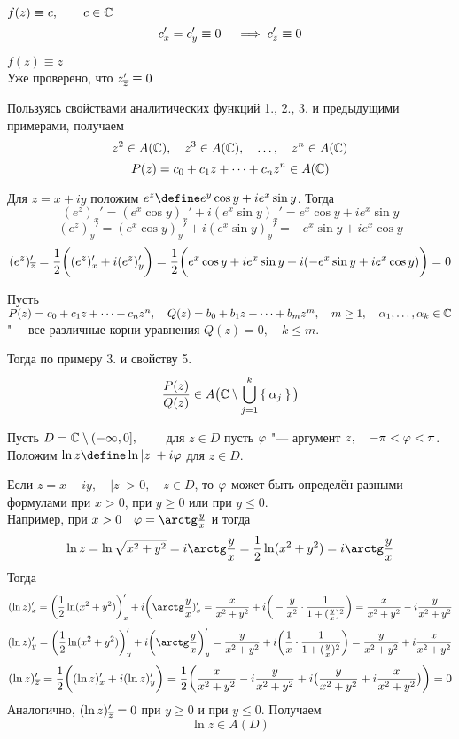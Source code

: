 \begin{exmpls}
	\item $ f(z) \equiv c, \qquad c \in \Co $
	$$ c_x' = c_y' \equiv 0 \quad \implies c_{\ol z}' \equiv 0 $$

	\item $ f(z) \equiv z $ \\
	Уже проверено, что $ z_{\ol z}' \equiv 0 $

	\item Пользуясь свойствами аналитических функций 1., 2., 3. и предыдущими примерами, получаем
	$$ z^2 \in A(\mathbb{C}), \quad z^3 \in A(\mathbb{C}), \quad \dots, \quad z^n \in A(\mathbb{C}) $$
	$$ P(z) = c_0 + c_1z + \dots + c_nz^n \in A(\mathbb{C}) $$

	\item Для $ z = x + iy $ положим $ e^z \define e^y \cos y + ie^x \sin y $. Тогда
	$$ (e^z)_x' = (e^x \cos y)_x' + i(e^x \sin y)_x' = e^x \cos y + ie^x \sin y $$
	$$ (e^z)_y' = (e^x \cos y)_y' + i(e^x \sin y)_y' = -e^x \sin y + ie^x \cos y $$
	$$ (e^z)_{\overline z}' = \frac12 \bigg( (e^z)_x' + i(e^z)_y' \bigg) = \frac12 \bigg( e^x\cos y + ie^x \sin y + i(-e^x \sin y + ie^x \cos y) \bigg) = 0 $$

	\item Пусть $ P(z) = c_0 + c_1z + \dots + c_nz^n, \quad Q(z) = b_0 + b_1z + \dots + b_mz^m, \quad m \ge 1, \quad \alpha_1, \dots, \alpha_k \in \mathbb{C} $ "--- все различные корни уравнения $ Q(z) = 0, \quad k \le m $.

	Тогда по примеру 3. и свойству 5.
	$$ \frac{P(z)}{Q(z)} \in A \big( \mathbb{C} \setminus \bigcup_{j = 1}^k \Set{\alpha_j} \big) $$

	\item Пусть $ D = \mathbb{C} \setminus (-\infty, 0], \qquad $ для $ z \in D $ пусть $ \varphi $ "--- аргумент $ z, \quad -\pi < \varphi < \pi $. \\
	Положим $ \ln z \define \ln|z| + i \vphi $ для $ z \in D $.

	Если $ z = x + iy, \quad |z| > 0, \quad z \in D $, то $ \varphi $ может быть определён разными формулами при $ x > 0 $, при $ y \ge 0 $ или при $ y \le 0 $. \\
	Например, при $ x > 0 \quad \vphi = \arctg \frac yx $ и тогда
	$$ \ln z = \ln \sqrt{x^2 + y^2} = i \arctg \frac yx = \frac12 \ln(x^2 + y^2) = i \arctg \frac yx $$
	Тогда
	$$ (\ln z)_x' = \bigg( \frac12 \ln(x^2 + y^2) \bigg)_x' + i \bigg( \arctg \frac yx)_x' = \frac x{x^2 + y^2} + i \bigg( -\frac y{x^2} \cdot \frac1{1 + (\frac yx)^2} \bigg) = \frac x{x^2 + y^2} - i \frac y{x^2 + y^2} $$
	$$ (\ln z)_y' = \bigg( \frac12 \ln(x^2 + y^2) \bigg)_y' + i \bigg( \arctg \frac yx \bigg)_y' = \frac y{x^2 + y^2} + i \bigg( \frac1x \cdot \frac1{1 + (\frac yx)^2} \bigg) = \frac y{x^2 + y^2} + i \frac x{x^2 + y^2} $$
	$$ (\ln z)_{\overline z}' = \frac12 \bigg( (\ln z)_x' + i(\ln z)_y' \bigg) = \frac12 \bigg( \frac x{x^2 + y^2} - i \frac y{x^2 + y^2} + i \big( \frac y{x^2 + y^2} + i \frac x{x^2 + y^2} \big) \bigg) = 0 $$
	Аналогично, $ (\ln z)_{\overline z}' = 0 $ при $ y \ge 0 $ и при $ y \le 0 $. Получаем
	$$ \ln z \in A(D) $$
\end{exmpls}

